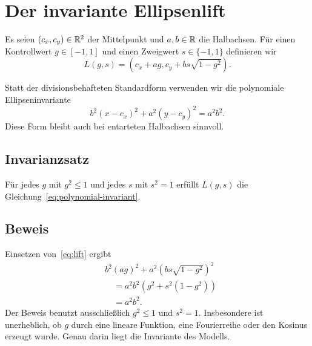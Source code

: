 \section{Der invariante Ellipsenlift}

Es seien $(c_x,c_y)\in\mathbb{R}^2$ der Mittelpunkt und $a,b\in\mathbb{R}$ die Halbachsen.
Für einen Kontrollwert $g\in[-1,1]$ und einen Zweigwert
$s\in\{-1,1\}$ definieren wir
\begin{equation}\label{eq:lift}
  L(g,s)=
  \left(
    c_x+ag,
    c_y+bs\sqrt{1-g^2}
  \right).
\end{equation}

Statt der divisionsbehafteten Standardform verwenden wir die polynomiale
Ellipseninvariante
\begin{equation}\label{eq:polynomial-invariant}
  b^2(x-c_x)^2+a^2(y-c_y)^2=a^2b^2.
\end{equation}
Diese Form bleibt auch bei entarteten Halbachsen sinnvoll.

\subsection*{Invarianzsatz}

Für jedes $g$ mit $g^2\leq1$ und jedes $s$ mit $s^2=1$ erfüllt
$L(g,s)$ die Gleichung~\eqref{eq:polynomial-invariant}.

\subsection*{Beweis}

Einsetzen von~\eqref{eq:lift} ergibt
\begin{align*}
 &b^2(ag)^2+a^2\left(bs\sqrt{1-g^2}\right)^2 \\
 &\quad=a^2b^2\left(g^2+s^2(1-g^2)\right)\\
 &\quad=a^2b^2.
\end{align*}
Der Beweis benutzt ausschließlich $g^2\leq1$ und $s^2=1$. Insbesondere ist
unerheblich, ob $g$ durch eine lineare Funktion, eine Fourierreihe oder den
Kosinus erzeugt wurde. Genau darin liegt die Invariante des Modells.
